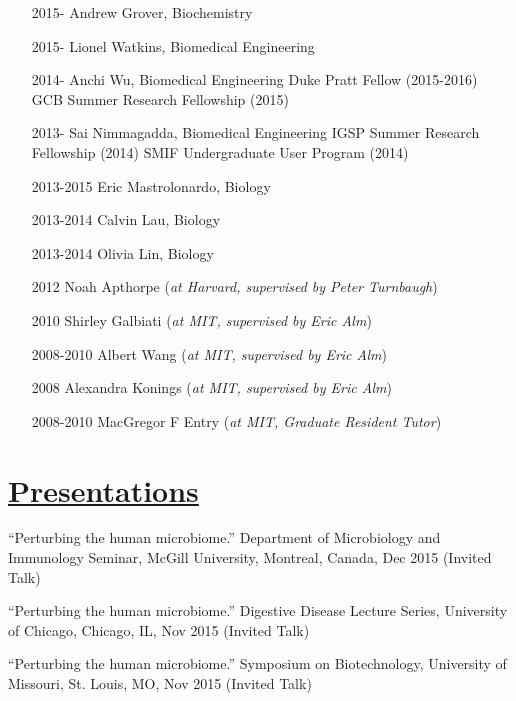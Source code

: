 \documentclass[overlapped,line,11pt]{res}
\begin{document}
\begin{resume}
\begin{itemize}[leftmargin=2cm, style=sameline, itemsep=0mm]
\item[2015-] Andrew Grover, Biochemistry 
\item[2015-] Lionel Watkins, Biomedical Engineering 
\item[2014-] Anchi Wu, Biomedical Engineering \newline 
  Duke Pratt Fellow (2015-2016)
  GCB Summer Research Fellowship (2015)
\item[2013-] Sai Nimmagadda, Biomedical Engineering \newline
  IGSP Summer Research Fellowship (2014) \newline
  SMIF Undergraduate User Program (2014)
\item[2013-2015] Eric Mastrolonardo, 
  Biology 
\item[2013-2014] Calvin Lau, Biology 
\item[2013-2014] Olivia Lin, Biology
\item[2012] Noah Apthorpe (\emph{at Harvard, supervised by Peter Turnbaugh})
\item[2010] Shirley Galbiati (\emph{at MIT, supervised by Eric Alm})
\item[2008-2010] Albert Wang (\emph{at MIT, supervised by Eric Alm})
\item[2008] Alexandra Konings (\emph{at MIT, supervised by Eric Alm})
\item[2008-2010] MacGregor F Entry (\emph{at MIT, Graduate Resident Tutor})
\end{itemize}

\section{\underline{\sc Presentations}}
\vspace{.25in}

\begin{revnumerate}[43]

\item {``Perturbing the human microbiome.''
  Department of Microbiology and Immunology Seminar, McGill University, Montreal, Canada, Dec 2015
  (Invited Talk)}
\vspace*{0mm}

\item {``Perturbing the human microbiome.''
  Digestive Disease Lecture Series, University of Chicago, Chicago, IL, Nov 2015
  (Invited Talk)}
\vspace*{0mm}

\item {``Perturbing the human microbiome.''
  Symposium on Biotechnology, University of Missouri, St. Louis, MO, Nov 2015
  (Invited Talk)}
\vspace*{0mm}


\end{revnumerate}
\end{resume}
\end{document}
